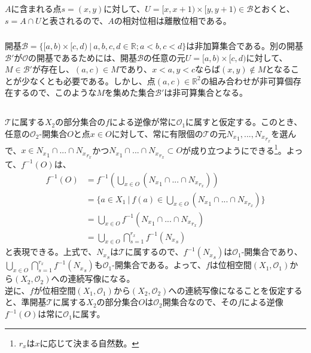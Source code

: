 \documentclass{jsarticle}
\begin{document}
\subsubsection{}
$A$に含まれる点$s=(x,y)$に対して、$U=[x,x+1)\times[y,y+1)\in\mathcal{B}$とおくと、$s=A\cap U$と表されるので、$A$の相対位相は離散位相である。
\subsubsection{}
開基$\mathcal{B}=\{[a,b)\times[c,d)\ |\ a,b,c,d\in\mathbb{R}; a<b, c<d\}$は非加算集合である。別の開基$\mathcal{B}'$が$\mathcal{O}$の開基であるためには、開基$\mathcal{B}$の任意の元$U=[a,b)\times[c,d)$に対して、$M\in\mathcal{B}'$が存在し、$(a,c)\in M$であり、$x<a,y<cならば(x,y)\notin M$となることが少なくとも必要である。しかし、点$(a,c)\in\mathbb{R}^2$の組み合わせが非可算個存在するので、このような$M$を集めた集合$\mathcal{B}'$は非可算集合となる。

\subsection{}
$\mathcal{T}$に属する$X_2$の部分集合の$f$による逆像が常に$\mathcal{O}_1$に属すと仮定する。このとき、任意の$\mathcal{O}_2$-開集合$O$と点$x\in O$に対して、常に有限個の$\mathcal{T}$の元${N_x}_{1},...,{N_x}_{r_x}$を選んで、$x\in {N_x}_{1}\cap...\cap {N_x}_{r_x}$かつ${N_x}_{1}\cap...\cap {N_x}_{r_x}\subset O$が成り立つようにできる\footnote{$r_x$は$x$に応じて決まる自然数。}。よって、$f^{-1}(O)$は、
\begin{align*}
f^{-1}(O)&=f^{-1}(\bigcup_{x\in O}({N_x}_{1}\cap...\cap {N_x}_{r_x}))\\
&=\{a\in X_1\ |\ f(a)\in\bigcup_{x\in O}({N_x}_{1}\cap...\cap {N_x}_{r_x})\} \\
&=\bigcup_{x\in O}f^{-1}({N_x}_{1}\cap...\cap {N_x}_{r_x})\\
&=\bigcup_{x\in O}\bigcap_{s=1}^{r_x}f^{-1}({N_x}_s)
\end{align*}
と表現できる。上式で、${N_x}_s$は$\mathcal{T}$に属するので、$f^{-1}({N_x}_s)$は$\mathcal{O}_1$-開集合であり、$\bigcup_{x\in O}\bigcap_{s=1}^{r_x}f^{-1}({N_x}_s)$も$\mathcal{O}_1$-開集合である。よって、$f$は位相空間$(X_1,\mathcal{O}_1)$から$(X_2,\mathcal{O}_2)$への連続写像になる。\\
逆に、$f$が位相空間$(X_1,\mathcal{O}_1)$から$(X_2,\mathcal{O}_2)$への連続写像になることを仮定すると、準開基$\mathcal{T}$に属する$X_2$の部分集合$O$は$\mathcal{O}_2$開集合なので、その$f$による逆像$f^{-1}(O)$は常に$\mathcal{O}_1$に属す。
\end{document}
